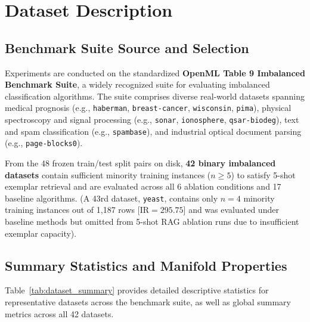 \documentclass[sn-basic]{sn-jnl}
\begin{document}
\section{Dataset Description}
\label{sec:dataset_description}

\subsection{Benchmark Suite Source and Selection}
Experiments are conducted on the standardized \textbf{OpenML Table 9 Imbalanced Benchmark Suite}, a widely recognized suite for evaluating imbalanced classification algorithms. The suite comprises diverse real-world datasets spanning medical prognosis (e.g., \texttt{haberman}, \texttt{breast-cancer}, \texttt{wisconsin}, \texttt{pima}), physical spectroscopy and signal processing (e.g., \texttt{sonar}, \texttt{ionosphere}, \texttt{qsar-biodeg}), text and spam classification (e.g., \texttt{spambase}), and industrial optical document parsing (e.g., \texttt{page-blocks0}).

From the 48 frozen train/test split pairs on disk, \textbf{42 binary imbalanced datasets} contain sufficient minority training instances ($n \ge 5$) to satisfy 5-shot exemplar retrieval and are evaluated across all 6 ablation conditions and 17 baseline algorithms. (A 43rd dataset, \texttt{yeast}, contains only $n = 4$ minority training instances out of 1,187 rows [$\text{IR} = 295.75$] and was evaluated under baseline methods but omitted from 5-shot RAG ablation runs due to insufficient exemplar capacity).

\subsection{Summary Statistics and Manifold Properties}
Table~\ref{tab:dataset_summary} provides detailed descriptive statistics for representative datasets across the benchmark suite, as well as global summary metrics across all 42 datasets.
\end{document}
